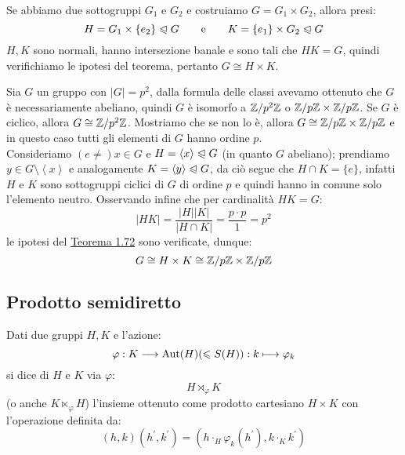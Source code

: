 \documentclass[11pt]{scrartcl}
\begin{document}
\begin{remark}
    Se abbiamo due sottogruppi $G_1$ e $G_2$ e costruiamo $G = G_1 \times G_2$, allora presi:
        \[ H = G_1 \times \{e_2\} \trianglelefteqslant G \qquad \text e \qquad K = \{e_1\} \times G_2 \trianglelefteqslant G
            \]
    $H,K$ sono normali, hanno intersezione banale e sono tali che $HK = G$, quindi verifichiamo le ipotesi del teorema, pertanto $G \cong H \times K$.
\end{remark}

\begin{example}
    Sia $G$ un gruppo con $|G| = p^2$, dalla formula delle classi avevamo ottenuto che $G$ è necessariamente abeliano, quindi $G$ è 
    isomorfo a $\mathbb Z/p^2\mathbb Z$ o ${\mathbb Z}/p{\mathbb Z} \times {\mathbb Z}/p{\mathbb Z}$. Se $G$ è ciclico, allora $G \cong \mathbb Z/p^2\mathbb Z$. Mostriamo che se non lo è, allora $G \cong {\mathbb Z}/p{\mathbb Z} \times {\mathbb Z}/p{\mathbb Z}$ e in 
    questo caso tutti gli elementi di $G$ hanno ordine $p$. \\
    Consideriamo $(e \ne) x \in G$ e $H = \left<x\right> \trianglelefteqslant G$ (in quanto $G$ abeliano); prendiamo $y \in G \setminus\left<x\right>$
    e analogamente $K = \left<y\right> \trianglelefteqslant G$, da ciò segue che $H \cap K = \{e\}$, infatti $H$ e $K$ sono sottogruppi ciclici di $G$ di 
    ordine $p$ e quindi hanno in comune solo l'elemento neutro.
    Osservando infine che per cardinalità $HK = G$:
        \[ |HK| = \frac{|H||K|}{|H \cap K|} = \frac{p\cdot p}{1} = p^2
            \]
    le ipotesi del \hyperref[t:1.72]{Teorema 1.72} sono verificate, dunque:
        \[ G \cong H \times K \cong {\mathbb Z}/p{\mathbb Z} \times {\mathbb Z}/p{\mathbb Z}
            \]
\end{example}

\newpage
\subsection{Prodotto semidiretto}

\begin{definition}
    Dati due gruppi $H,K$ e l'azione:
        \[ \varphi : K \longrightarrow \operatorname{Aut}(H) (\leqslant S(H)) : k \longmapsto \varphi_k
            \]
    si dice  di $H$ e $K$ via $\varphi$:
        \[ H \rtimes_{\varphi} K
            \]
    (o anche $K \ltimes_{\varphi} H$) l'insieme ottenuto come prodotto cartesiano $H \times K$ con l'operazione definita da:
        \[ (h,k) (h^{\prime},k^{\prime}) = (h \cdot_H \varphi_k(h^{\prime}), k \cdot_K k^{\prime})
            \]
\end{definition}
\end{document}
